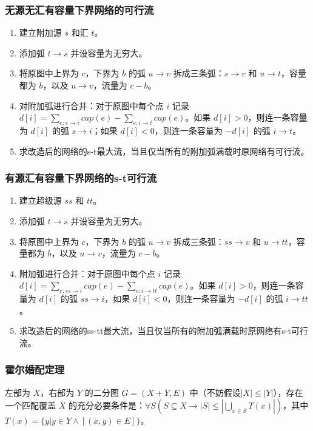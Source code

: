 \subsubsection{无源无汇有容量下界网络的可行流}

\begin{enumerate}
\item 建立附加源 $s$ 和汇 $t$。
\item 添加弧 $t\to s$ 并设容量为无穷大。
\item 将原图中上界为 $c$，下界为 $b$ 的弧 $u\to v$ 拆成三条弧：$s\to v$ 和 $u \to t$，容量都为 $b$，以及 $u\to v$，流量为 $c-b$。
\item 对附加弧进行合并：对于原图中每个点 $i$ 记录 $d[i]=\sum\limits_{e:s\to i} cap(e) - \sum\limits_{e:i\to t} cap(e)$。如果 $d[i]>0$，则连一条容量为 $d[i]$ 的弧 $s\to i$；如果 $d[i]<0$，则连一条容量为 $-d[i]$ 的弧 $i\to t$。
\item 求改造后的网络的s-t最大流，当且仅当所有的附加弧满载时原网络有可行流。
\end{enumerate}

\subsubsection{有源汇有容量下界网络的s-t可行流}

\begin{enumerate}
\item 建立超级源 $ss$ 和 $tt$。
\item 添加弧 $t\to s$ 并设容量为无穷大。
\item 将原图中上界为 $c$，下界为 $b$ 的弧 $u\to v$ 拆成三条弧：$ss\to v$ 和 $u \to tt$，容量都为 $b$，以及 $u\to v$，流量为 $c-b$。
\item 附加弧进行合并：对于原图中每个点 $i$ 记录 $d[i]=\sum\limits_{e:ss\to i} cap(e) - \sum\limits_{e:i\to tt} cap(e)$。如果 $d[i]>0$，则连一条容量为 $d[i]$ 的弧 $ss\to i$，如果 $d[i]<0$，则连一条容量为 $-d[i]$ 的弧 $i\to tt$。
\item 求改造后的网络的ss-tt最大流，当且仅当所有的附加弧满载时原网络有s-t可行流。
\end{enumerate}

\subsubsection{霍尔婚配定理}

左部为 $X$，右部为 $Y$ 的二分图 $G=(X+Y,E)$ 中（不妨假设$|X|\le|Y|$），存在一个匹配覆盖 $X$ 的充分必要条件是：$\displaystyle\forall S(S\subseteq X \to\left|S\right|\le\left|\bigcup\limits_{x\in S}T(x)\right|)$，其中 $T(x)=\{y|y\in Y\land\left[(x,y)\in E\right]\}$。

